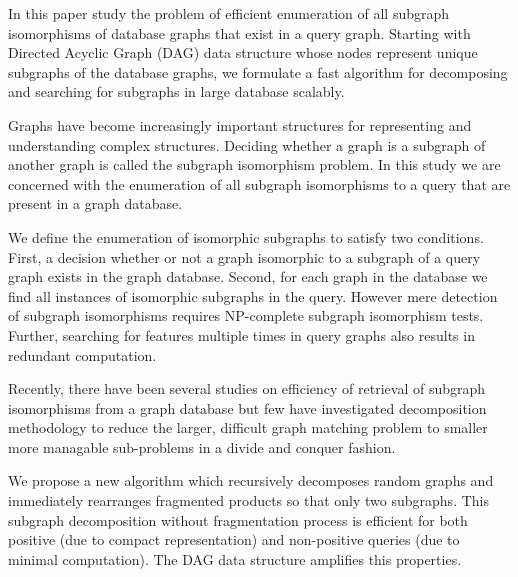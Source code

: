 
In this paper study the problem of efficient enumeration of all subgraph isomorphisms of database graphs that exist in a query graph. Starting with Directed Acyclic Graph (DAG) data structure whose nodes represent unique subgraphs of the database graphs, we formulate a fast algorithm for decomposing and searching for subgraphs in large database scalably.

Graphs have become increasingly important structures for representing and understanding complex structures. Deciding whether a graph is a subgraph of another graph is called the subgraph isomorphism problem. In this study we are concerned with the enumeration of all subgraph isomorphisms to a query that are present in a graph database.

We define the enumeration of isomorphic subgraphs to satisfy two conditions. First, a decision whether or not a graph isomorphic to a subgraph of a query graph exists in the graph database. Second, for each graph in the database we find all instances of isomorphic subgraphs in the query. 
However mere detection of subgraph isomorphisms requires NP-complete subgraph isomorphism tests. Further, searching for features multiple times in query graphs also results in redundant computation.

Recently, there have been several studies on efficiency of retrieval of subgraph isomorphisms from a graph database but few have investigated decomposition methodology to reduce the larger, difficult graph matching problem to smaller more managable sub-problems in a divide and conquer fashion. 


We propose a new algorithm which recursively decomposes random graphs and immediately rearranges fragmented products so that only two subgraphs. This subgraph decomposition without fragmentation process is efficient for both positive (due to compact representation) and non-positive queries (due to minimal computation). The DAG data structure amplifies this properties.

